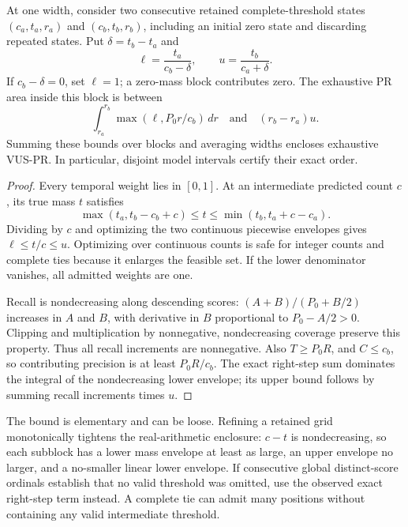 \begin{theorem}
\label{thm:threshold-enclosure}
At one width, consider two consecutive retained complete-threshold states
$(c_a,t_a,r_a)$ and $(c_b,t_b,r_b)$, including an initial zero state and
discarding repeated states. Put $\delta=t_b-t_a$ and
\[
 \ell=\frac{t_a}{c_b-\delta},\qquad
 u=\frac{t_b}{c_a+\delta}.
\]
If $c_b-\delta=0$, set $\ell=1$; a zero-mass block contributes zero.
The exhaustive PR area inside this block is between
\begin{equation}
 \int_{r_a}^{r_b}\max(\ell,P_0r/c_b)\,dr
 \quad\text{and}\quad (r_b-r_a)u.
 \label{eq:block-bounds}
\end{equation}
Summing these bounds over blocks and averaging widths encloses exhaustive
VUS-PR. In particular, disjoint model intervals certify their exact order.
\end{theorem}
\begin{proof}
Every temporal weight lies in $[0,1]$. At an intermediate predicted count
$c$, its true mass $t$ satisfies
\[
 \max(t_a,t_b-c_b+c)\leq t\leq\min(t_b,t_a+c-c_a).
\]
Dividing by $c$ and optimizing the two continuous piecewise envelopes
gives $\ell\leq t/c\leq u$. Optimizing over continuous counts is safe
for integer counts and complete ties because it enlarges the feasible
set. If the lower denominator vanishes, all admitted weights are one.

Recall is nondecreasing along descending scores: $(A+B)/(P_0+B/2)$
increases in $A$ and $B$, with derivative in $B$ proportional to
$P_0-A/2>0$. Clipping and multiplication by nonnegative, nondecreasing
coverage preserve this property. Thus all recall increments are nonnegative.
Also $T\geq P_0R$, and $C\leq c_b$, so contributing precision is at
least $P_0R/c_b$. The exact right-step sum dominates the integral of the
nondecreasing lower envelope; its upper bound follows by summing recall
increments times $u$.
\end{proof}

The bound is elementary and can be loose. Refining a retained grid
monotonically tightens the real-arithmetic enclosure: $c-t$ is
nondecreasing, so each subblock has a lower mass envelope at least as
large, an upper envelope no larger, and a no-smaller linear lower envelope.
If consecutive global distinct-score ordinals establish that no valid
threshold was omitted, use the observed exact right-step term instead.
A complete tie can admit many positions without containing any valid
intermediate threshold.


